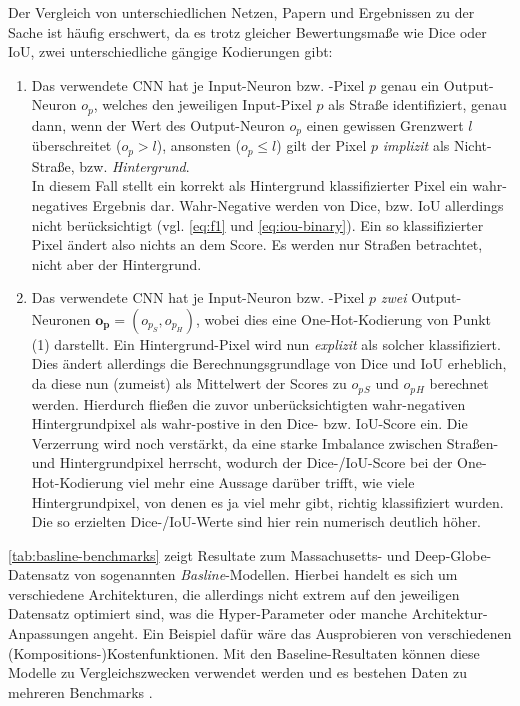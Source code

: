 Der Vergleich von unterschiedlichen Netzen, Papern und Ergebnissen zu der Sache ist häufig erschwert, 
da es trotz gleicher Bewertungsmaße wie Dice oder \ac{IoU}, zwei unterschiedliche gängige Kodierungen gibt:
\begin{enumerate}
	\item Das verwendete \ac{CNN} hat je Input-Neuron bzw. -Pixel $p$ genau ein Output-Neuron $o_p$, welches den jeweiligen Input-Pixel $p$
	als Straße identifiziert, genau dann, wenn der Wert des Output-Neuron $o_p$ einen gewissen Grenzwert $l$ überschreitet ($o_p > l$), 
	ansonsten ($o_p \leq l$) gilt der Pixel $p$ \textit{implizit} als Nicht-Straße, bzw. \textit{Hintergrund}. \\
	In diesem Fall stellt ein korrekt als Hintergrund klassifizierter Pixel ein wahr-negatives Ergebnis dar. 
	Wahr-Negative werden von Dice, bzw. \ac{IoU} allerdings nicht berücksichtigt (vgl. \autoref{eq:f1} und \ref{eq:iou-binary}).
	Ein so klassifizierter Pixel ändert also nichts an dem Score. Es werden nur Straßen betrachtet, nicht aber der Hintergrund.    
	\item Das verwendete \ac{CNN} hat je Input-Neuron bzw. -Pixel $p$ \textit{zwei} Output-Neuronen $\mathbf{o_p} = (o_{p_S}, o_{p_H})$, 
	wobei dies eine One-Hot-Kodierung von Punkt (1) darstellt. 
	Ein Hintergrund-Pixel wird nun \textit{explizit} als solcher klassifiziert. 
	Dies ändert allerdings die Berechnungsgrundlage von Dice und \ac{IoU} erheblich, da diese nun (zumeist) als Mittelwert 
	der Scores zu $o_p{_S}$ und $o_p{_H}$ berechnet werden. Hierdurch fließen die zuvor unberücksichtigten wahr-negativen 
	Hintergrundpixel als wahr-postive in den Dice- bzw. \ac{IoU}-Score ein. Die Verzerrung wird noch verstärkt, 
	da eine starke Imbalance zwischen Straßen- und Hintergrundpixel herrscht, wodurch der Dice-/\ac{IoU}-Score bei 
	der One-Hot-Kodierung viel mehr eine Aussage darüber trifft, wie viele Hintergrundpixel, von denen es ja viel mehr gibt,
	richtig klassifiziert wurden. Die so erzielten Dice-/IoU-Werte sind hier rein numerisch deutlich höher. 
\end{enumerate}

\autoref{tab:basline-benchmarks} zeigt Resultate zum Massachusetts- und Deep-Globe-Datensatz von sogenannten \textit{Basline}-Modellen.
Hierbei handelt es sich um verschiedene Architekturen, die allerdings nicht extrem auf den jeweiligen Datensatz optimiert sind,
was die Hyper-Parameter oder manche Architektur-Anpassungen angeht. Ein Beispiel dafür wäre das Ausprobieren von verschiedenen (Kompositions-)Kostenfunktionen. 
Mit den Baseline-Resultaten können diese Modelle zu Vergleichszwecken verwendet werden 
und es bestehen Daten zu mehreren Benchmarks \cite{C.Henry.2021}.

